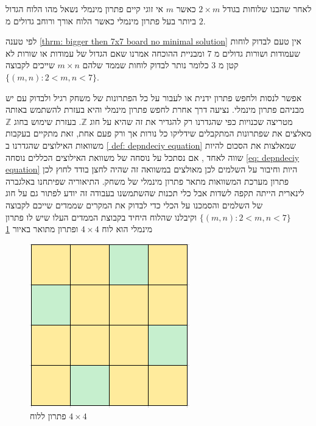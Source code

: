 \documentclass[12pt,twoside]{article}
\begin{document}
לאחר שהבנו שלוחות בגודל 
$2 \times m$
כאשר 
$m$
אי זוגי 
קיים פתרון מינמלי נשאל מהו הלוח 
הגדול ביותר
בעל פתרון מינמלי כאשר 
הלוח אורך ורוחב גדולים מ
$2$.

לפי טענה 
\ref{thrm: bigger then 7x7 board no minimal solution} 
אין טעם לבדוק לוחות שעמודות ושורות גדולים מ
$7$
ומבניית ההוכחה 
אמרנו שאם 
הגדול של עמודות או שורות לא קטן
מ
$3$
כלומר נותר לבדוק לוחות שממד שלהם 
$m \times n$
שייכים לקבוצה
$\{ (m,n) : 2 < m,n <7 \}$.

אפשר לנסות ולחפש פתרון ידנית
או לעבור על כל הפתרונות של משחק רגיל ולבדוק עם יש מבניהם פתרון 
מינמלי.
נציעה דרך אחרת לחפש פתרון 
מינמלי
והיא בעזרת להשתמש באותה מטריצה שכנויות כפי שהגדרנו רק להגדיר 
את זה שהיא על חוג 
$\mathbb{Z}$.
בעזרת שימוש בחוג 
$\mathbb{Z}$
מאלצים את שפתרונות המתקבלים
שידליקו כל נורות אך ורק פעם אחת,
זאת מתקיים בעקבות 
משוואות האילוצים שהגדרנו ב
\ref{ def: depndeciy equation}
שמאלצות את הסכום להיות שווה לאחד
,
אם נסתכל על נוסחה של משוואת האילוצים הכללים 
נוסחה
\ref{eq: depndeciy equation}
היות וחיבור על השלמים לכן 
מאולצים במשוואה זה שהיה לחצן בודד לחוץ 
לכן פתרון מערכת המשוואות מתאר פתרון 
מינמלי של משחק.
התיאוריה שפיתחנו באלגברה לינארית הייתה תקפה לשדות 
אבל כלי תכנות שהשתמשנו
בעבודה זה יודע לפתור גם על חוג של השלמים 
והסמכנו על הכלי כדי לבדוק את המקרים
שממדים שייכם לקבוצה 
$\{ (m,n) : 2 < m,n <7 \}$
וקיבלנו שהלוח
היחיד בקבוצת הממדים העלו שיש לו פתרון מינמלי 
הוא
לוח 
$4 \times 4$
ופתרון מתואר באיור 
\ref{fig:4x4_have_min_sol}

\begin{figure}[ht]
    \caption{פתרון ללוח 
    $4 \times 4$}
    \label{fig:4x4_have_min_sol}
    \unsethebrew
    \centering
    \includegraphics[width=.7\textwidth,height=.7\textheight,keepaspectratio]{images/4x4_min_sol.PNG}
\end{figure}
\sethebrew
\end{document}
